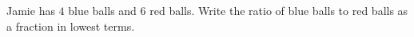 Jamie has $4$ blue balls and $6$ red balls. Write the ratio of blue balls to red balls as a fraction in lowest terms.

